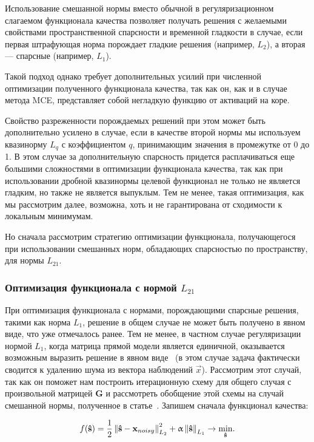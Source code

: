 Использование смешанной нормы вместо обычной в регуляризационном слагаемом
функционала качества позволяет получать решения с желаемыми свойствами
пространственной спарсности и временной гладкости в случае, если первая штрафующая норма
порождает гладкие решения (например, $L_2$), а вторая --- спарсные (например, $L_1$).

Такой подход однако требует дополнительных усилий при численной оптимизации
полученного функционала качества, так как он, как и в случае метода MCE,
представляет собой негладкую функцию от активаций на коре.

Свойство разреженности порождаемых решений при этом может быть дополнительно
усилено в случае, если в качестве второй нормы мы используем квазинорму $L_q$ с
коэффициентом $q$, принимающим значения в промежутке от 0 до 1. В этом случае
за дополнительную спарсность придется расплачиваться еще большими сложностями в
оптимизации функционала качества, так как при использовании дробной квазинормы
целевой функционал не только не является гладким, но также не является
выпуклым. Тем не менее, такая оптимизация, как мы рассмотрим далее, возможна,
хоть и не гарантирована от сходимости к локальным минимумам.

Но сначала рассмотрим стратегию оптимизации функционала, получающегося при
использовании смешанных норм, обладающих спарсностью по пространству, для нормы
$L_{21}$.

\subsubsection{Оптимизация функционала с нормой $L_{21}$}

При оптимизация функционала с нормами, порождающими спарсные решения, такими
как норма $L_1$, решение в общем случае не может быть получено в явном виде,
что уже отмечалось ранее.  Тем не менее, в частном случае регуляризации нормой
$L_1$, когда матрица прямой модели является единичной, оказывается возможным
выразить решение в явном виде~\cite{Selensick_sparse_signal_restoration} (в
этом случае задача фактически сводится к удалению шума из вектора наблюдений
$\vec{x}$). Рассмотрим этот случай, так как он поможет нам построить
итерационную схему для общего случая с произвольной матрицей $\mathbf{G}$ и
рассмотреть обобщение этой схемы на случай смешанной нормы, полученное в
статье~\cite{gramfort_2012}. Запишем сначала функционал качества:

\begin{equation}
    f(\mathbf{\hat{s}}) = \frac{1}{2}\left\lVert\mathbf{\hat{s} - x}_{noisy}\right\rVert^2_{L_2} + \upalpha\left\lVert\mathbf{\hat{s}}\right\rVert_{L_1}
    \rightarrow \underset{\mathbf{\hat{s}}}{\min}.
    \label{eq:denoising_crit}
\end{equation}

